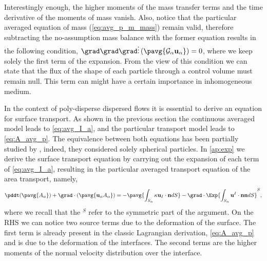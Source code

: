 Interestingly enough, the higher moments of the mass transfer terms and the time derivative of the moments of mass vanish. 
Also, notice that the particular averaged equation of mass (\ref{eq:avg_p_m_mass}) remain valid, therefore subtracting the no-assumption mass balance with the former equation results in the following condition, $\grad\grad\grad \vdots \left(\pavg{ \mathcal{G}_\alpha\textbf{u}_\alpha}\right) = 0$, where we keep solely the first term of the expansion. 
From the view of this condition we can state that the flux of the shape of each particle through a control volume must remain null. 
This term can might have a certain importance in inhomogeneous medium. 

In the context of poly-disperse dispersed flows it is essential to derive an equation for surface transport. 
As shown in the previous section the continuous averaged model leads to \ref{eq:avg_I_a}, and the particular transport model leads to \ref{eq:A_avg_p}. 
The equivalence between both equations has been partially studied by \citep{lhuillier2000bilan}, indeed, they considered solely spherical particles. 
In \ref{ap:exp} we derive the surface transport equation by carrying out the expansion of each term of \ref{eq:avg_I_a}, resulting in the particular averaged transport equation of the area transport, namely, 
\begin{equation}
    \pddt (\pavg{A_\alpha})
    + \grad \cdot (\pavg{\textbf{u}_\alpha A_\alpha})
    = -\pavg{\int_{S_\alpha} \kappa\textbf{u}_I\cdot \textbf{n} dS }\\
    - \grad \cdot \Exp{\int_{S_\alpha} \textbf{u}^I \cdot\textbf{nn} dS}^S,
    \label{eq:hybrid_area}
\end{equation}
where we recall that the $^S$ refer to the symmetric part of the argument. 
On the RHS we can notice two source terms due to the deformation of the surface. 
The first term is already present in the classic Lagrangian derivation, \ref{eq:A_avg_p} and is due to the deformation of the interfaces. 
The second  terms are the higher moments of the normal velocity distribution over the interface. 

